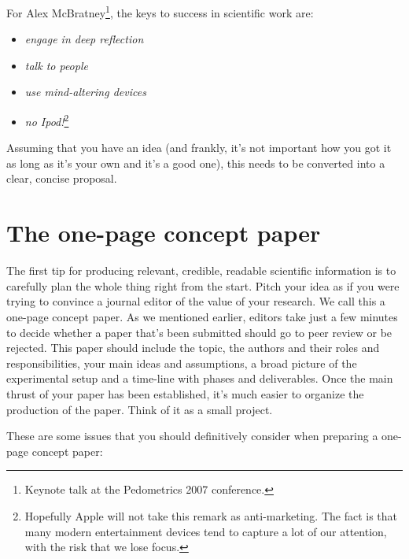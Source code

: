 \documentclass[graybox,envcountchap,sectrefs,UStrade]{svmono}
\begin{document}
For Alex McBratney\footnote{Keynote talk at the Pedometrics 2007 conference.}, the keys to success in scientific work are:

\begin{itemize}
  \item \emph{engage in deep reflection}
  \item \emph{talk to people}
  \item \emph{use mind-altering devices}
  \item \emph{no Ipod!}\footnote{Hopefully Apple will not take this remark as anti-marketing. The fact is that many modern entertainment devices tend to capture a lot of our attention, with the risk that we lose focus.}
\end{itemize}

Assuming that you have an idea (and frankly, it's not important how you got it as long as it's your own and it's a good one), this needs to be converted into a clear, concise proposal. \par


 \section{The one-page concept paper}\label{sec:one_page_concept}

The first tip for producing relevant, credible, readable scientific information is to carefully plan the whole thing right from the start. Pitch your idea as if you were trying to convince a journal editor of the value of your research. We call this a one-page concept paper. As we mentioned earlier, editors take just a few minutes to decide whether a paper that's been submitted should go to peer review or be rejected. This paper should include the topic, the authors and their roles and responsibilities, your main ideas and assumptions, a broad picture of the experimental setup and a time-line with phases and deliverables. Once the main thrust of your paper has been established, it's much easier to organize the production of the paper. Think of it as a small project.\par

These are some issues that you should definitively consider when preparing a one-page concept paper:
\end{document}
